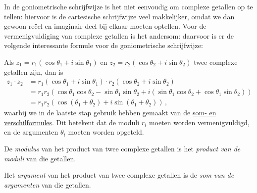 \documentclass{ximera}
\begin{document}
In de goniometrische schrijfwijze is het niet eenvoudig om complexe getallen op te tellen: hiervoor is de cartesische schrijfwijze veel makkelijker, omdat we dan gewoon reëel en imaginair deel bij elkaar moeten optellen. Voor de vermenigvuldiging van complexe getallen is het andersom: daarvoor is er de volgende interessante formule voor de goniometrische schrijfwijze:
 
Als $z_1=r_1 (\cos \theta_1 + i \sin \theta_1 ) $ en $z_2 = r_2(\cos \theta_2 + i \sin \theta_2 )$ twee complexe getallen zijn, dan is
\begin{align*}
z_1\cdot z_2 &= r_1 (\cos \theta_1 + i \sin \theta_1 )\cdot r_2 (\cos\theta_2 + i \sin \theta_2 )\\
             &= r_1 r_2 (\cos \theta_1 \cos \theta_2 - \sin \theta_1  \sin\theta_2 + i(\sin \theta_1 \cos \theta_2 + \cos \theta_1  \sin
\theta_2 ))\\
             &= r_1 r_2 ( \cos(\theta_1 + \theta_2) + i \sin(\theta_1 + \theta_2)) \, ,
\end{align*}
waarbij we in de laatste stap gebruik hebben gemaakt van de \hyperref[xim:goniometrie_formules]{som- en verschilformules}.
Dit betekent dat de moduli $r_i$ moeten worden vermenigvuldigd, en de argumenten $\theta_i$ moeten worden opgeteld.
 
\begin{proposition}\label{eig:vermenigvuldiging_complexe_getallen}\nl
     
De \textit{modulus} van het product van twee complexe getallen is het \textit{product van de moduli} van die getallen.
 
Het \textit{argument} van het product van twee complexe getallen is de \textit{som van de argumenten} van die getallen.
\end{proposition}
 
\end{document}
